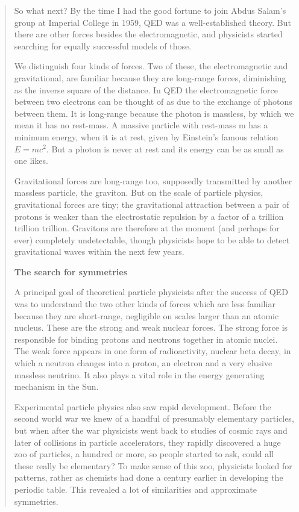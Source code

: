 \begin{quote}
So what next? By the time I had the good fortune to join Abdus Salam’s group at Imperial College in 1959, QED was a well-established theory. But there are other forces besides the electromagnetic, and physicists started searching for equally successful models of those.

We distinguish four kinds of forces. Two of these, the electromagnetic and gravitational, are familiar because they are long-range forces, diminishing as the inverse square of the distance. In QED the electromagnetic force between two electrons can be thought of as due to the exchange of photons between them. It is long-range because the photon is massless, by which we mean it has no rest-mass. A massive particle with rest-mass m has a minimum energy, when it is at rest, given by Einstein’s famous relation $E = mc^2$. But a photon is never at rest and its energy can be as small as one likes.

Gravitational forces are long-range too, supposedly transmitted by another massless particle, the graviton. But on the scale of particle physics, gravitational forces are tiny; the gravitational attraction between a pair of protons is weaker than the electrostatic repulsion by a factor of a trillion trillion trillion. Gravitons are therefore at the moment (and perhaps for ever) completely undetectable, though physicists hope to be able to detect gravitational waves within the next few years.

\textbf{The search for symmetries}

A principal goal of theoretical particle physicists after the success of QED was to understand the two other kinds of forces which are less familiar because they are short-range, negligible on scales larger than an atomic nucleus. These are the strong and weak nuclear forces. The strong force is responsible for binding protons and neutrons together in atomic nuclei. The weak force appears in one form of radioactivity, nuclear beta decay, in which a neutron changes into a proton, an electron and a very elusive massless neutrino. It also plays a vital role in the energy generating mechanism in the Sun.

Experimental particle physics also saw rapid development. Before the second world war we knew of a handful of presumably elementary particles, but when after the war physicists went back to studies of cosmic rays and later of collisions in particle accelerators, they rapidly discovered a huge zoo of particles, a hundred or more, so people started to ask, could all these really be elementary? To make sense of this zoo, physicists looked for patterns, rather as chemists had done a century earlier in developing the periodic table. This revealed a lot of similarities and approximate symmetries.


\end{quote}
